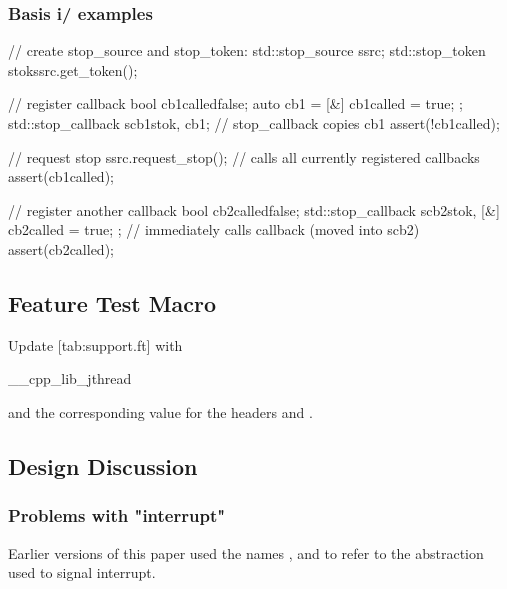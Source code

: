\subsubsection*{Basis i/ examples}

\begin{codeblock}
// create stop_source and stop_token:
std::stop_source ssrc;
std::stop_token stok{ssrc.get_token()};

// register callback
bool cb1called{false};
auto cb1 = [&]{ cb1called = true; };
std::stop_callback scb1{stok, cb1};  // stop_callback copies cb1
assert(!cb1called);

// request stop
ssrc.request_stop();                 // calls all currently registered callbacks
assert(cb1called);

// register another callback
bool cb2called{false};
std::stop_callback scb2{stok, 
                        [&]{ cb2called = true; }
                       };            // immediately calls callback (moved into scb2)
assert(cb2called);
\end{codeblock}

\subsection*{Feature Test Macro}

{\color{insertcolor}
Update [tab:support.ft] with
\begin{codeblock}
	__cpp_lib_jthread
\end{codeblock}
and the corresponding value
for the headers  and .
}%


\clearpage


\subsection*{Design Discussion}

\subsubsection*{Problems with "interrupt"}

Earlier versions of this paper used the names ,
 and  to refer to the
abstraction used to signal interrupt.

